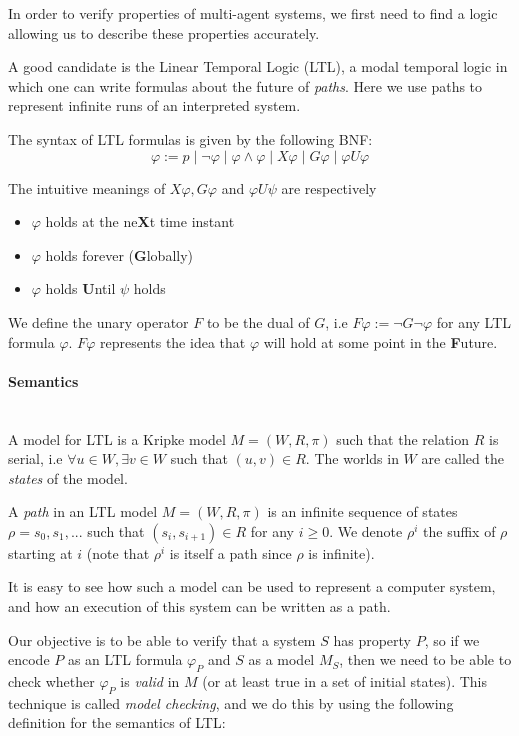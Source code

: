 \documentclass[11pt]{report}
\newenvironment{definition}[1][Definition]{\begin{trivlist}
\item[\hskip \labelsep {\bfseries #1}]}{\end{trivlist}}
\newcommand{\myparagraph}[1]{\paragraph{#1}\mbox{}\\}
\begin{document}
In order to verify properties of multi-agent systems, we first need to find a logic allowing us to describe these properties accurately. 

A good candidate is the Linear Temporal Logic (LTL), a modal temporal logic in which one can write formulas about the future of \emph{paths}. Here we use paths to represent infinite runs of an interpreted system. 

\begin{definition} 
The syntax of LTL formulas is given by the following BNF: 
$$\varphi := p \mid \lnot\varphi \mid \varphi \land \varphi \mid X\varphi \mid G\varphi \mid \varphi U\varphi$$
\end{definition}

The intuitive meanings of $X\varphi, G\varphi$ and $\varphi U\psi$ are respectively 
\begin{itemize} 
\item $\varphi$ holds at the ne\textbf{X}t time instant
\item $\varphi$ holds forever (\textbf{G}lobally)
\item $\varphi$ holds \textbf{U}ntil $\psi$ holds  
\end{itemize}

We define the unary operator $F$ to be the dual of $G$, i.e $F\varphi := \lnot G\lnot\varphi$ for any LTL formula $\varphi$. $F\varphi$ represents the idea that $\varphi$ will hold at some point in the \textbf{F}uture.   

\myparagraph{Semantics} 

A model for LTL is a Kripke model $M = (W, R, \pi)$ such that the relation $R$ is serial, i.e $\forall u \in W,  \exists v \in W$ such that $(u, v) \in R$.
The worlds in $W$ are called the \textit{states} of the model. 

\begin{definition} 
A \textit{path} in an LTL model $M = (W, R, \pi)$ is an infinite sequence of states $\rho = s_0, s_1, ...$ such that $(s_i, s_{i+1}) \in R$ for any $i \geq 0$.
We denote $\rho^i$ the suffix of $\rho$ starting at $i$ (note that $\rho^i$ is itself a path since $\rho$ is infinite).
\end{definition}

It is easy to see how such a model can be used to represent a computer system, and how an execution of this system can be written as a path.

 Our objective is to be able to verify that a system $S$ has property $P$, so if we encode $P$ as an LTL formula $\varphi_P$ and $S$ as a model $M_S$, then we need to be able to check whether $\varphi_P$ is \textit{valid} in $M$ (or at least true in a set of initial states). This technique is called \textit{model checking}, and we do this by using the following definition for the semantics of LTL:
\label{model_checking}
\end{document}
